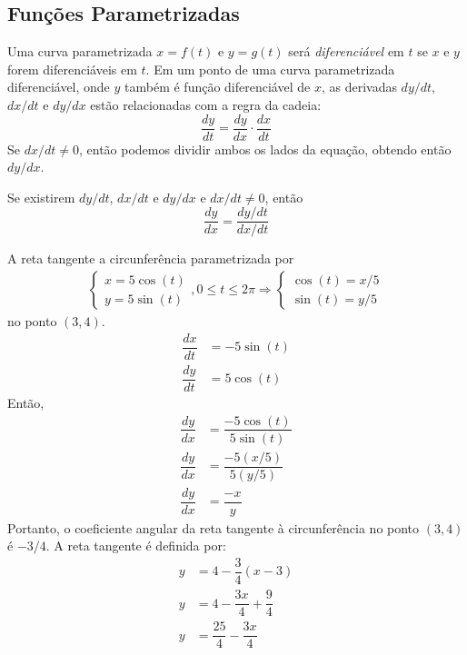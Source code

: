\subsection{Funções Parametrizadas}
Uma curva parametrizada $x=f(t)$ e $y=g(t)$ será \emph{diferenciável} em $t$ se $x$ e $y$ forem diferenciáveis em $t$. Em um ponto de uma curva parametrizada diferenciável, onde $y$ também é função diferenciável de $x$, as derivadas $dy/dt$, $dx/dt$ e $dy/dx$ estão relacionadas com a regra da cadeia:
\[\dfrac{dy}{dt}=\dfrac{dy}{dx}\cdot \dfrac{dx}{dt}\]
Se $dx/dt \neq 0 $, então podemos dividir ambos os lados da equação, obtendo então $dy/dx$.
\begin{prop}
Se existirem $dy/dt$, $dx/dt$ e $dy/dx$ e $dx/dt \neq 0$, então
\[\dfrac{dy}{dx}=\dfrac{dy/dt}{dx/dt}\]
\end{prop}
\begin{exemplo}
A reta tangente a circunferência parametrizada por
\begin{align*}
\begin{cases}
x=5\cos(t)\\
y=5\sin(t)
\end{cases} , 0\leq t \leq 2\pi \Rightarrow
\begin{cases}
\cos(t)=x/5 \\
\sin(t)=y/5
\end{cases}
\end{align*}
no ponto $(3,4)$.
\begin{align*}
\dfrac{dx}{dt}&=-5\sin(t)\\
\dfrac{dy}{dt}&=5\cos(t)
\end{align*}
Então,
\begin{align*}
\dfrac{dy}{dx}&=\dfrac{-5\cos(t)}{5\sin(t)}\\
\dfrac{dy}{dx}&=\dfrac{-5(x/5)}{5(y/5)} \\
\dfrac{dy}{dx}&=\dfrac{-x}{y}
\end{align*}
Portanto, o coeficiente angular da reta tangente à circunferência no ponto $(3,4)$ é $-3/4$. A reta tangente é definida por:
\begin{align*}
y&=4-\dfrac{3}{4}(x-3)\\
y&=4-\dfrac{3x}{4}+\dfrac{9}{4} \\
y&=\dfrac{25}{4}-\dfrac{3x}{4}
\end{align*}
\end{exemplo}

